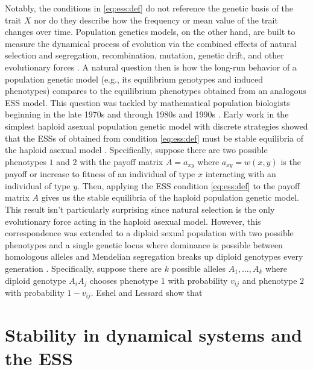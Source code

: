 \documentclass[11pt]{article}
\newcommand{\w}{w}
\begin{document}
Notably, the conditions in \eqref{eq:ess:def} do not reference the genetic basis of the trait $X$ nor do they describe how the frequency or mean value of the trait changes over time. Population genetics models, on the other hand, are built to measure the dynamical process of evolution via the combined effects of natural selection and segregation, recombination, mutation, genetic drift, and other evolutionary forces \cite{Crow:Kimura:1970,Ewens:2004}. A natural question then is how the long-run behavior of a population genetic model (e.g., its equilibrium genotypes and induced phenotypes) compares to the equilibrium phenotypes obtained from an analogous ESS model. This question was tackled by mathematical population biologists beginning in the late 1970s and through 1980s and 1990s \cite[e..g,][]{Taylor:Jonker:1978,Hofbauer:Schuster:1979,Zeeman:1980,Eshel:1982,Hofbauer:Schuster:1982,Lessard:1984,Cressman:1988,Cressman:Hines:1984,Cressman:Hofbauer:1996,Hammerstein:1996,Weissing:1996,Eshel:1996,Eshel:Feldman:1984}. Early work in the simplest haploid asexual population genetic model with discrete strategies showed that the ESSs of obtained from condition \eqref{eq:ess:def} must be stable equilibria of the haploid asexual model \cite{Taylor:Jonker:1978,Hofbauer:Schuster:1979,Zeeman:1980}. Specifically, suppose there are two possible phenotypes $1$ and $2$ with the payoff matrix $A = {a_{xy}}$ where $a_{xy} = \w(x,y)$ is the payoff or increase to fitness of an individual of type $x$ interacting with an individual of type $y$. Then, applying the ESS condition \eqref{eq:ess:def} to the payoff matrix $A$ gives us the stable equilibria of the haploid population genetic model. This result isn't particularly surprising since natural selection is the only evolutionary force acting in the haploid asexual model. However, this correspondence was extended to a diploid sexual population with two possible phenotypes and a single genetic locus where dominance is possible between homologous alleles and Mendelian segregation breaks up diploid genotypes every generation \cite{Eshel:1982,Lessard:1984}. Specifically, suppose there are $k$ possible alleles $A_{1},\ldots,A_{k}$ where diploid genotype $A_{i} A_{j}$ chooses phenotype $1$ with probability $v_{ij}$ and phenotype $2$ with probability $1-v_{ij}$. Eshel and Lessard show  \cite{Eshel:1982,Lessard:1984} that




\section{Stability in dynamical systems and the ESS}
\end{document}
